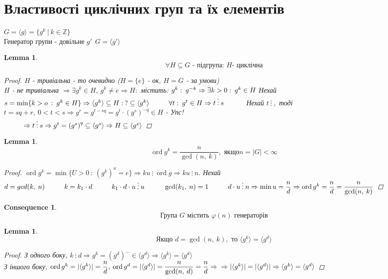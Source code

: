 \documentclass[a4paper,12pt, centered]{bookest}
\newtheorem{lemma}[theorem]{Lemma}
\newtheorem*{cons*}{Consequence}
\DeclareMathOperator{\ord}{ord}
\newcommand\tab[1][1cm]{\hspace*{#1}}
\begin{document}
\section{Властивості циклічних груп та їх елементів}
$G=\langle g\rangle=\{g^k\>|\>k\in\mathbb{Z}\}$\\
Генератор групи - довільне $g'\>\>G=\langle g'\rangle$
\begin{lemma}
	$$\forall H\subseteq G\textrm{ - підгрупа: }H\textrm{- циклічна}$$
	\begin{proof}
		$H$ - тривіальна - то очевидно ($H=\{e\}$ - ок, $H=G$ - за умови) \\
		$H$ - не тривіальна $\Rightarrow\exists g^k\in H,\>g^k\neq e\Rightarrow H:$ містить: $g^k:\>g^{-k}\Rightarrow\exists k>0:\>g^k\in H\\$ Нехай $s=\min\{k>o\>:\>g^k\in H\}\Rightarrow\langle g^k\rangle\subseteq H:\>?\subseteq \langle g^k\rangle\\\tab \forall t:\>g^t\in H\Rightarrow t\>\vdots\>s\\\tab $ Нехай $t\overline{\>\vdots\>},$ тоді $t=sq+r,\>0< t< s\Rightarrow g^r=g^{t-sq}=g^t\cdot  \left( g^s\right)^{-q}\in H$ - Упс!\\ $\tab\Rightarrow t\>\vdots\>s\Rightarrow g^t=\left(g^s\right)^q\subseteq\langle g^s\rangle\Rightarrow H\subseteq\langle g^s\rangle$
	\end{proof}
\end{lemma}
\begin{lemma}
	$$\ord g^k=\dfrac{n}{\gcd(n,\>k)},\textrm{ якщо}n=|G|<\infty$$
	\begin{proof}
		$\ord g^k=\min\{U>0\>:\>\left(g^k\right)^u=e\}\Rightarrow ku\>\vdots\>\ord g\Rightarrow ku\>\vdots\>n.$ Нехай $d=gcd(k,\>n)\\\tab k=k_1\cdot  d\tab k_1\cdot  d\cdot  u\>\vdots\>u\\\tab \gcd(k_1,\>n)=1\tab d\cdot u\>\vdots\>n\\\Rightarrow\min u=\dfrac nd\Rightarrow\ord g^k=\dfrac nd=\dfrac{n}{\gcd(n,\>k)}$
	\end{proof}
\end{lemma}
\begin{cons*}
	$$\textrm{Група } G\textrm{ містить }\varphi(n)\textrm{ генераторів}$$
\end{cons*}
\begin{lemma}
	$$\textrm{Якщо }d=\gcd(n,\>k),\textrm{ то }\langle g^k\rangle=\langle g^d\rangle$$
	\begin{proof}
		З одного боку, $k\>\vdots\>d\Rightarrow g^k=\left(g^d\right)^{\dots}\in\langle g^d\rangle\Rightarrow\langle g^k\rangle=\langle g^d\rangle$\\
		З іншого боку, $\ord g^k=|\langle g^k\rangle|=\dfrac nd,\>\ord g^d=|\langle g^d\rangle|=\dfrac n{\gcd(n,\>d)}=\dfrac nd\Rightarrow\\\Rightarrow|\langle g^k\rangle|=|\langle g^d\rangle|\Rightarrow \langle g^k\rangle=\langle g^d\rangle$
	\end{proof}
\end{lemma}
\end{document}
